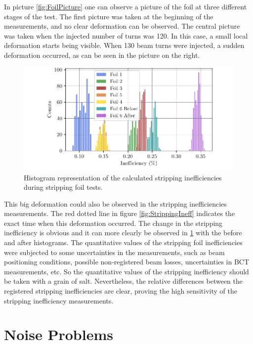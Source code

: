 In picture \ref{fig:FoilPicture} one can observe a picture of the foil at three different stages of the test. The first picture was taken at the beginning of the measurements, and no clear deformation can be observed. The central picture was taken when the injected number of turns was 120. In this case, a small local deformation starts being visible. When 130 beam turns were injected, a sudden deformation occurred, as can be seen in the picture on the right. 

\begin{figure}[h]
    \centering
    \includegraphics[width=\columnwidth]{StrippingEfficiency13April/Histo.pdf}
    \caption{Histogram representation of the calculated stripping inefficiencies during stripping foil tests. }
    \label{fig:Histo}
\end{figure}

This big deformation could also be observed in the stripping inefficiencies measurements. The red dotted line in figure \ref{fig:StrippingIneff} indicates the exact time when this deformation occurred. The change in the stripping inefficiency is obvious and it can more clearly be observed in \ref{fig:Histo} with the before and after histograms. The quantitative values of the stripping foil inefficiencies were subjected to some uncertainties in the measurements, such as beam positioning conditions, possible non-registered beam losses, uncertainties in BCT measurements, etc. So the quantitative values of the stripping inefficiency should be taken with a grain of salt. Nevertheless, the relative differences between the registered stripping inefficiencies are clear, proving the high sensitivity of the stripping inefficiency measurements. 

\section{Noise Problems}
\label{sec:NoiseProblem}

